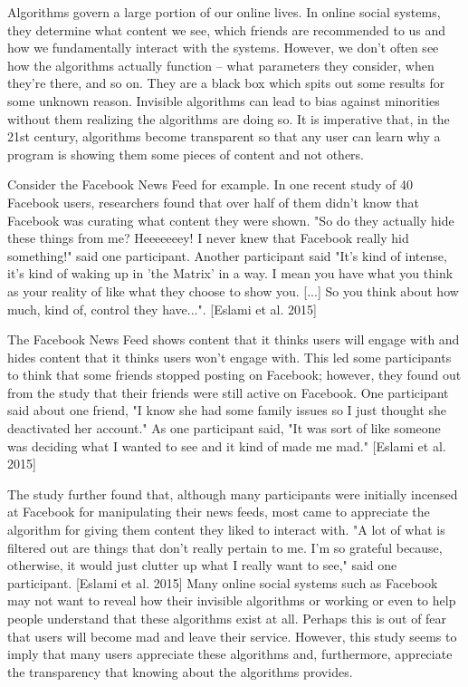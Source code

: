 \documentclass[class=book, crop=false]{standalone}
\begin{document}
Algorithms govern a large portion of our online lives. In online social systems, they determine what content we see, which friends are recommended to us and how we fundamentally interact with the systems. However, we don't often see how the algorithms actually function -- what parameters they consider, when they're there, and so on. They are a black box which spits out some results for some unknown reason. Invisible algorithms can lead to bias against minorities without them realizing the algorithms are doing so. It is imperative that, in the 21st century, algorithms become transparent so that any user can learn why a program is showing them some pieces of content and not others.

Consider the Facebook News Feed for example. In one recent study of 40 Facebook users, researchers found that over half of them didn't know that Facebook was curating what content they were shown. "So do they actually hide these things from me? Heeeeeeey! I never knew that Facebook really hid something!" said one participant. Another participant said "It's kind of intense, it's kind of waking up in 'the Matrix' in a way. I mean you have what you think as your reality of like what they choose to show you. [...] So you think about how much, kind of, control they have...". [Eslami et al. 2015]

The Facebook News Feed shows content that it thinks users will engage with and hides content that it thinks users won't engage with. This led some participants to think that some friends stopped posting on Facebook; however, they found out from the study that their friends were still active on Facebook. One participant said about one friend, "I know she had some family issues so I just thought she deactivated her account." As one participant said, "It was sort of like someone was deciding what I wanted to see and it kind of made me mad." [Eslami et al. 2015]

The study further found that, although many participants were initially incensed at Facebook for manipulating their news feeds, most came to appreciate the algorithm for giving them content they liked to interact with. "A lot of what is filtered out are things that don't really pertain to me. I'm so grateful because, otherwise, it would just clutter up what I really want to see," said one participant. [Eslami et al. 2015] Many online social systems such as Facebook may not want to reveal how their invisible algorithms or working or even to help people understand that these algorithms exist at all. Perhaps this is out of fear that users will become mad and leave their service. However, this study seems to imply that many users appreciate these algorithms and, furthermore, appreciate the transparency that knowing about the algorithms provides.
\end{document}
